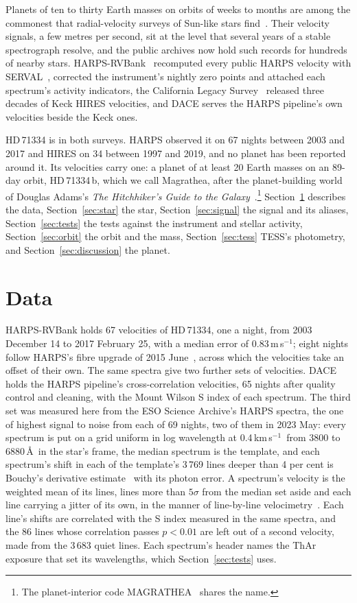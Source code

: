 \documentclass[3p,11pt]{elsarticle}
\newcommand{\kms}{km\,s$^{-1}$}
\newcommand{\ms}{m\,s$^{-1}$}
\begin{document}
Planets of ten to thirty Earth masses on orbits of weeks to months are among the commonest that
radial-velocity surveys of Sun-like stars find~\cite{Howard2010}. Their velocity signals, a few metres
per second, sit at the level that several years of a stable spectrograph resolve, and the public archives
now hold such records for hundreds of nearby stars. HARPS-RVBank~\cite{Trifonov2020} recomputed every
public HARPS velocity with SERVAL~\cite{Zechmeister2018}, corrected the instrument's nightly zero
points and attached each spectrum's activity indicators, the California Legacy
Survey~\cite{Rosenthal2021} released three decades of Keck HIRES velocities, and DACE serves the HARPS
pipeline's own velocities beside the Keck ones.

HD\,71334 is in both surveys. HARPS observed it on 67 nights between 2003 and 2017 and HIRES on 34
between 1997 and 2019, and no planet has been reported around it. Its velocities carry one: a planet
of at least 20 Earth masses on an 89-day orbit, HD\,71334\,b, which we call Magrathea, after the
planet-building world of Douglas Adams's \emph{The Hitchhiker's Guide to the
Galaxy}~\cite{Adams1979}.\footnote{The planet-interior code MAGRATHEA~\cite{Huang2022} shares the
name.}
Section~\ref{sec:data} describes the data, Section~\ref{sec:star} the star, Section~\ref{sec:signal}
the signal and its aliases, Section~\ref{sec:tests} the tests against the instrument and stellar
activity, Section~\ref{sec:orbit} the orbit and the mass, Section~\ref{sec:tess} TESS's photometry, and
Section~\ref{sec:discussion} the planet.

\section{Data}\label{sec:data}

HARPS-RVBank holds 67 velocities of HD\,71334, one a night, from 2003 December 14 to 2017 February
25, with a median error of 0.83\,\ms; eight nights follow HARPS's fibre upgrade of 2015
June~\cite{LoCurto2015}, across which the velocities take an offset of their own. The same spectra give
two further sets of velocities. DACE holds the HARPS pipeline's cross-correlation velocities, 65 nights
after quality control and cleaning, with the Mount Wilson S index of each spectrum. The third set was
measured here from the ESO Science Archive's HARPS spectra, the one of highest signal to noise from
each of 69 nights, two of them in 2023 May: every spectrum is put on a grid uniform in log wavelength
at 0.4\,\kms\ from 3800 to 6880\,\AA\ in the star's frame, the median spectrum is the template, and
each spectrum's shift in each of the template's 3\,769 lines deeper than 4 per cent is Bouchy's
derivative estimate~\cite{Bouchy2001} with its photon error. A spectrum's velocity is the weighted mean
of its lines, lines more than $5\sigma$ from the median set aside and each line carrying a jitter of its
own, in the manner of line-by-line velocimetry~\cite{Artigau2022}. Each line's shifts are correlated
with the S index measured in the same spectra, and the 86 lines whose correlation passes $p < 0.01$ are
left out of a second velocity, made from the 3\,683 quiet lines. Each spectrum's header names the ThAr
exposure that set its wavelengths, which Section~\ref{sec:tests} uses.
\end{document}
